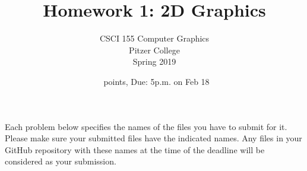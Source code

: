 \documentclass[addpoints]{exam}
\title{Homework 1: 2D Graphics}
\author{CSCI 155 Computer Graphics\\Pitzer College\\Spring 2019}
\date{\numpoints\ points, Due: 5p.m. on Feb 18}
\begin{document}
\maketitle

Each problem below specifies the names of the files you have to submit for it. Please make sure your submitted files have the indicated names. Any files in your GitHub repository with these names at the time of the deadline will be considered as your submission.


\end{document}

